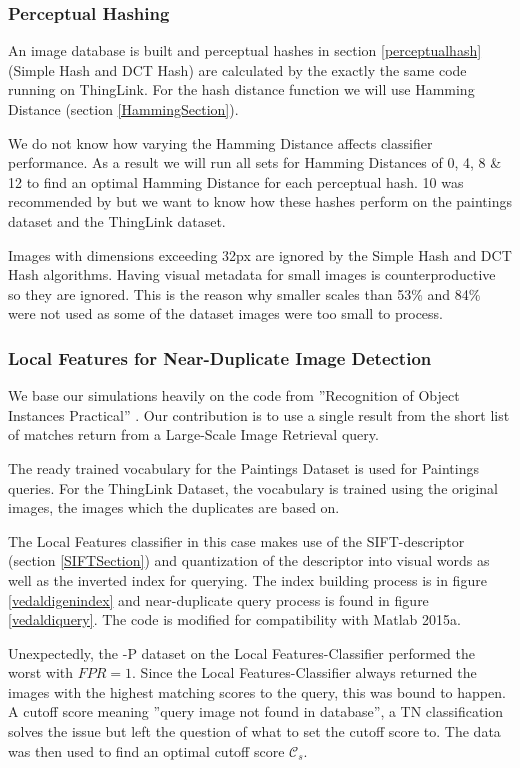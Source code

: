 \documentclass[english,12pt,a4paper,pdftex,elec,utf8, table]{aaltothesis}
\begin{document}
\subsubsection{Perceptual Hashing}
An image database is built and perceptual hashes in section \ref{perceptualhash} (Simple Hash and DCT Hash) are calculated by the exactly the same code running on ThingLink. For the hash distance function we will use Hamming Distance (section \ref{HammingSection}).

We do not know how varying the Hamming Distance affects classifier performance. As a result we will run all sets for Hamming Distances of 0, 4, 8 \& 12 to find an optimal Hamming Distance for each perceptual hash. 10 was recommended by \cite{Zauner2010} but we want to know how these hashes perform on the paintings dataset and the ThingLink dataset.

Images with dimensions exceeding 32px are ignored by the Simple Hash and DCT Hash algorithms. Having visual metadata for small images is counterproductive so they are ignored. This is the reason why smaller scales than 53\% and 84\% were not used as some of the dataset images were too small to process.

\subsubsection{Local Features for Near-Duplicate Image Detection}
We base our simulations heavily on the code from ''Recognition of Object Instances Practical'' \cite{Vedaldi2012}. Our contribution is to use a single result from the short list of matches return from a Large-Scale Image Retrieval query.

The ready trained vocabulary for the Paintings Dataset is used for Paintings queries. For the ThingLink Dataset, the vocabulary is trained using the original images, the images which the duplicates are based on.

The Local Features classifier in this case makes use of the SIFT-descriptor (section \ref{SIFTSection}) and quantization of the descriptor into visual words as well as the inverted index for querying. The index building process is in figure \ref{vedaldigenindex} and near-duplicate query process is found in figure \ref{vedaldiquery}. The code is modified for compatibility with Matlab 2015a.

Unexpectedly, the -P dataset on the Local Features-Classifier performed the worst with $FPR = 1$. Since the Local Features-Classifier always returned the images with the highest matching scores to the query, this was bound to happen. A cutoff score meaning ''query image not found in database'', a TN classification solves the issue but left the question of what to set the cutoff score to. The data was then used to find an optimal cutoff score $\mathcal{C}_s$.
\end{document}
